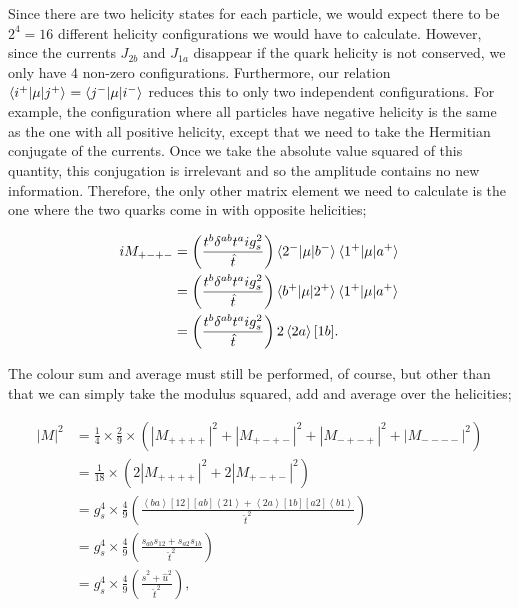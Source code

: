 Since there are two helicity states for each particle, we would expect there to be $2^4 = 16$ different helicity configurations we would have to calculate. However, since the currents $J_{2b}$ and $J_{1a}$ disappear if the quark helicity is not conserved, we only have $4$ non-zero configurations. Furthermore, our relation $\mathinner{\langle i^+\vert\mu\vert j^+\rangle}_{} = \mathinner{\langle j^-\vert\mu\vert i^-\rangle}_{}$ reduces this to only two independent configurations. For example, the configuration where all particles have negative helicity is the same as the one with all positive helicity, except that we need to take the Hermitian conjugate of the currents. Once we take the absolute value squared of this quantity, this conjugation is irrelevant and so the amplitude contains no new information. Therefore, the only other matrix element we need to calculate is the one where the two quarks come in with opposite helicities;

\begin{equation}
\begin{split}
iM_{+-+-} & =  \left(\frac{t^b \delta^{ab} t^a i g_s^2}{\hat{t}} \right) \mathinner{\langle2^-\vert\mu\vert b^-\rangle}_{} \mathinner{\langle1^+\vert\mu\vert a^+\rangle}_{} \\
&=  \left(\frac{t^b \delta^{ab} t^a i g_s^2}{\hat{t}} \right) \mathinner{\langle b^+\vert\mu\vert2^+\rangle}_{} \mathinner{\langle1^+\vert\mu\vert a^+\rangle}_{} \\
&=  \left(\frac{t^b \delta^{ab} t^a i g_s^2}{\hat{t}} \right) 2 \left<2 a \right> [1 b].
\end{split}
\end{equation}

The colour sum and average must still be performed, of course, but other than that we can simply take the modulus squared, add and average over the helicities;

\begin{equation}
\begin{split}
|M|^2 &= \frac{1}{4} \times \frac{2}{9} \times \left(|M_{++++}|^2 + |M_{+-+-}|^2  + |M_{-+-+}|^2  + |M_{----}|^2 \right) \\
&= \frac{1}{18} \times \left(2 |M_{++++}|^2 + 2 |M_{+-+-}|^2 \right) \\
&= g_s^4 \times \frac{4}{9} \left(\frac{ \left<b a \right> [1 2] [ab] \left<2 1 \right> + \left<2 a \right> [1 b] [a2] \left<b 1 \right> }{\hat{t}^2}\right) \\
&=  g_s^4 \times \frac{4}{9} \left(\frac{s_{ab} s_{12} + s_{a2}s_{1b} }{\hat{t}^2} \right) \\
&= g_s^4 \times \frac{4}{9} \left(\frac{\hat{s}^2 + \hat{u}^2}{\hat{t}^2} \right),
\end{split}
\end{equation}

